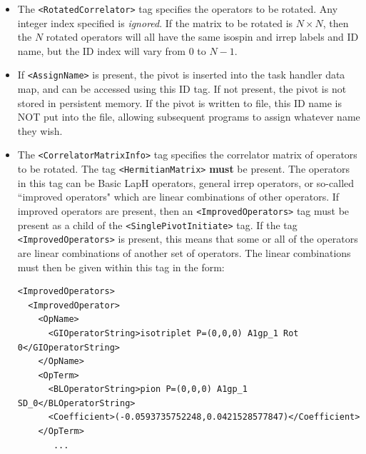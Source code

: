 \documentclass[12pt]{article}
\newcommand{\vb}{\texttt}
\begin{document}
\begin{itemize}
\item 
The \vb{<RotatedCorrelator>} tag specifies the operators to be rotated. Any integer index 
specified is \textit{ignored}.  If the matrix to be rotated is $N\times N$, then the $N$
rotated operators will all have the same isospin and irrep labels and ID name, but the 
ID index will vary from $0$ to $N-1$.
\item                                                               
If \vb{<AssignName>} is present, the pivot is inserted into the task handler       
data map, and can be accessed using this ID tag.  If not present, the         
pivot is not stored in persistent memory.  If the pivot is written to         
file, this ID name is NOT put into the file, allowing subsequent programs     
to assign whatever name they wish.                                             
\item                                                                           
The \vb{<CorrelatorMatrixInfo>} tag specifies the correlator matrix of operators   
to be rotated. The tag \vb{<HermitianMatrix>} \textbf{must} be present.  The operators      
in this tag can be Basic LapH operators, general irrep operators, or          
so-called ``improved operators" which are linear combinations of other          
operators.  If improved operators are present, then an \vb{<ImprovedOperators>}    
tag must be present as a child of the \vb{<SinglePivotInitiate>} tag.  If the tag  
\vb{<ImprovedOperators>} is present, this means that some or all of the operators  
are linear combinations of another set of operators.  The linear combinations 
must then be given within this tag in the form: 
\begin{verbatim}                                                     
<ImprovedOperators>                                                          
  <ImprovedOperator>                                                         
    <OpName>                                                                
      <GIOperatorString>isotriplet P=(0,0,0) A1gp_1 Rot 0</GIOperatorString>
    </OpName>                                                               
    <OpTerm>                                                                
      <BLOperatorString>pion P=(0,0,0) A1gp_1 SD_0</BLOperatorString>       
      <Coefficient>(-0.0593735752248,0.0421528577847)</Coefficient>         
    </OpTerm>                                                               
       ...                                                                    

\end{verbatim}
\end{itemize}
\end{document}
